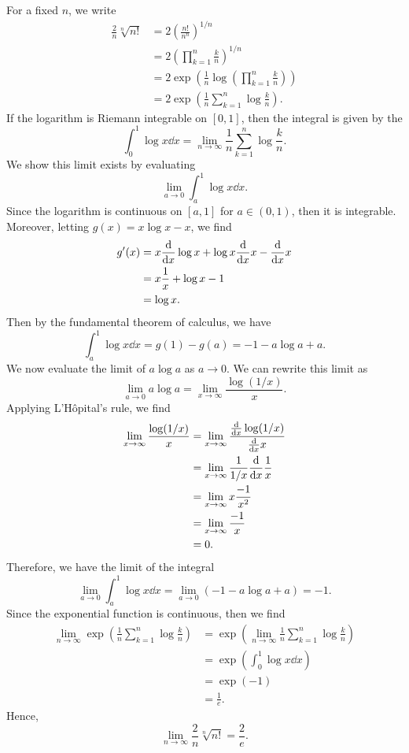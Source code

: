\documentclass[12pt]{article}
\theoremstyle{definition}
\newcommand{\pfrac}[2]{\left(\frac{#1}{#2}\right)}
\begin{document}
For a fixed $n$, we write
\begin{align*}
    \frac{2}{n}\sqrt[n]{n!}
        &= 2 \pfrac{n!}{n^n}^{1/n} \\
        &= 2 \left(\prod_{k=1}^{n} \frac{k}{n} \right)^{1/n} \\
        &= 2 \exp(\frac{1}{n} \log(\prod\limits_{k=1}^{n} \frac{k}{n})) \\
        &= 2 \exp(\frac{1}{n} \sum\limits_{k=1}^{n}\log \frac{k}{n}).
\end{align*}
If the logarithm is Riemann integrable on $[0,1]$, then the integral is given by the
\[
    \int_0^1 \log x \dd{x} = \lim_{n\to \infty} \frac{1}{n} \sum\limits_{k=1}^{n}\log \frac{k}{n}.
\]
We show this limit exists by evaluating
\[
    \lim_{a \to 0} \int_a^1 \log x \dd{x}.
\]
Since the logarithm is continuous on $[a, 1]$ for $a \in (0,1)$, then it is integrable. Moreover, letting $g(x) = x\log x - x$, we find
\begin{align*}
    g'(x)
        &= x\dv{x} \log x + \log x \dv{x}x - \dv{x}x \\
        &= x\frac{1}{x} + \log x - 1 \\
        &= \log x.
\end{align*}
Then by the fundamental theorem of calculus, we have
\[
    \int_a^1 \log x \dd{x}
        = g(1) - g(a)
        = -1 - a\log a + a.
\]
We now evaluate the limit of $a \log a$ as $a \to 0$. We can rewrite this limit as
\[
    \lim_{a \to 0} a \log a
        = \lim_{x \to \infty} \frac{\log(1/x)}{x}.
\]
Applying L'H\^opital's rule, we find
\begin{align*}
    \lim_{x \to \infty} \frac{\log(1/x)}{x}
        &= \lim_{x \to \infty} \frac{\dv{x}\log(1/x)}{\dv{x}x} \\
        &= \lim_{x \to \infty} \frac{1}{1/x}\dv{x}\frac{1}{x} \\
        &= \lim_{x \to \infty} x\frac{-1}{x^2} \\
        &= \lim_{x \to \infty} \frac{-1}{x} \\
        &= 0.
\end{align*}
Therefore, we have the limit of the integral
\[
    \lim_{a \to 0} \int_a^1 \log x \dd{x}
        = \lim_{a \to 0}(-1 - a\log a + a)
        = -1.
\]
Since the exponential function is continuous, then we find
\begin{align*}
    \lim_{n\to\infty} \exp(\frac{1}{n} \sum\limits_{k=1}^{n}\log \frac{k}{n})
        &= \exp(\lim_{n\to\infty} \frac{1}{n} \sum\limits_{k=1}^{n}\log \frac{k}{n}) \\
        &= \exp(\int_0^1 \log x \dd{x}) \\
        &= \exp(-1) \\
        &= \frac{1}{e}.
\end{align*}
Hence,
\[
    \lim_{n\to\infty} \frac{2}{n}\sqrt[n]{n!} = \frac{2}{e}.
\]
    
\end{document}
